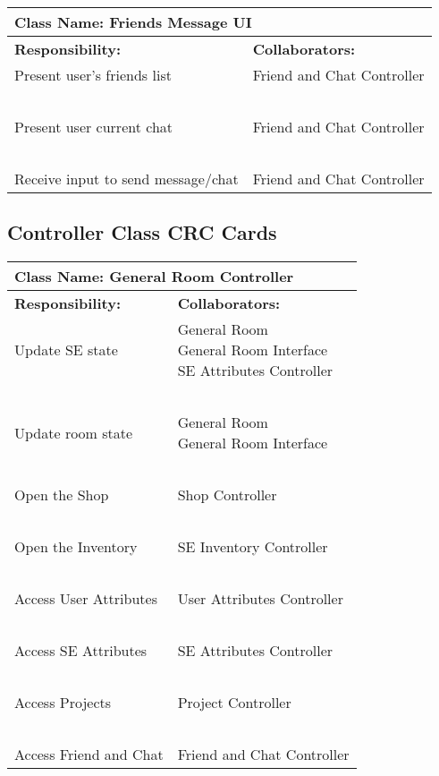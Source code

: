 \documentclass[]{article}
\begin{document}
\begin{table}[H]
    \centering
    \begin{tabular}{|p{5cm}|p{5cm}|}
        \hline
        \multicolumn{2}{|l|}{\textbf{Class Name:} Friends Message UI}\\
        \hline
        \textbf{Responsibility:} & \textbf{Collaborators:}\\
        \hline
        Present user’s friends list & Friend and Chat Controller\\
        ~ & ~\\
        Present user current chat & Friend and Chat Controller\\
        ~ & ~\\
        Receive input to send message/chat & Friend and Chat Controller\\
        \hline
    \end{tabular}
\end{table}

\subsection{Controller Class CRC Cards}
\label{sec:controller_class_CRC_cards}

\begin{table}[H]
    \centering
    \begin{tabular}{|p{5cm}|p{5cm}|}
        \hline
        \multicolumn{2}{|l|}{\textbf{Class Name:} General Room Controller}\\
        \hline
        \textbf{Responsibility:} & \textbf{Collaborators:}\\
        \hline
        Update SE state & \makecell[l]{General Room \\ General Room Interface \\ SE Attributes Controller}\\
        ~ & ~\\
        Update room state & \makecell[l]{General Room \\ General Room Interface}\\
        ~ & ~\\
        Open the Shop & Shop Controller\\
        ~ & ~\\
        Open the Inventory & SE Inventory Controller\\
        ~ & ~\\
        Access User Attributes & User Attributes Controller\\
        ~ & ~\\
        Access SE Attributes & SE Attributes Controller\\
        ~ & ~\\
        Access Projects & Project Controller\\
        ~ & ~\\
        Access Friend and Chat & Friend and Chat Controller\\
        \hline
    \end{tabular}
\end{table}
\end{document}
